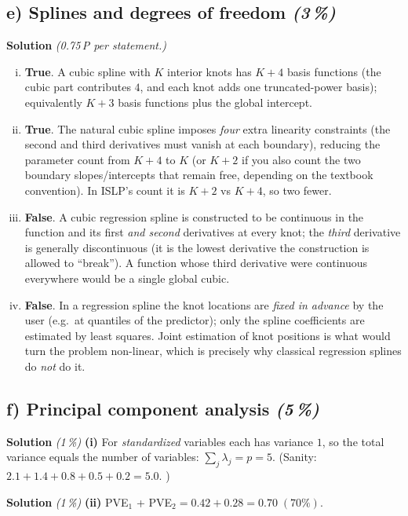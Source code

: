 \documentclass[11pt,a4paper]{article}
\newcommand{\subpoints}[1]{\textit{(#1\,\%)}}
\newcommand{\sol}{\noindent\textbf{Solution}}
\begin{document}
\subsection*{e) Splines and degrees of freedom \subpoints{3}}
\sol{} \emph{(0.75\,P per statement.)}
\begin{enumerate}[(i)]
  \item \textbf{True}. A cubic spline with $K$ interior knots has $K+4$ basis functions
        (the cubic part contributes $4$, and each knot adds one truncated-power basis); equivalently
        $K+3$ basis functions plus the global intercept.
  \item \textbf{True}. The natural cubic spline imposes \emph{four} extra linearity constraints
        (the second and third derivatives must vanish at each boundary), reducing the parameter
        count from $K+4$ to $K$ (or $K+2$ if you also count the two boundary slopes/intercepts that
        remain free, depending on the textbook convention). In ISLP's count it is $K+2$ vs $K+4$,
        so two fewer.
  \item \textbf{False}. A cubic regression spline is constructed to be continuous in the function
        and its first \emph{and second} derivatives at every knot; the \emph{third} derivative is
        generally discontinuous (it is the lowest derivative the construction is allowed to
        ``break''). A function whose third derivative were continuous everywhere would be a single
        global cubic.
  \item \textbf{False}. In a regression spline the knot locations are \emph{fixed in advance} by
        the user (e.g.\ at quantiles of the predictor); only the spline coefficients are estimated
        by least squares. Joint estimation of knot positions is what would turn the problem
        non-linear, which is precisely why classical regression splines do \emph{not} do it.
\end{enumerate}

\subsection*{f) Principal component analysis \subpoints{5}}

\sol{} \subpoints{1} \textbf{(i)} For \emph{standardized} variables each has variance $1$, so the
total variance equals the number of variables: $\sum_j \lambda_j = p = \boxed{5}$.
(Sanity: $2.1+1.4+0.8+0.5+0.2 = 5.0$. \checkmark)

\medskip
\sol{} \subpoints{1} \textbf{(ii)} PVE$_1$ + PVE$_2 = 0.42 + 0.28 = \boxed{0.70}\;(70\%)$.
\end{document}
